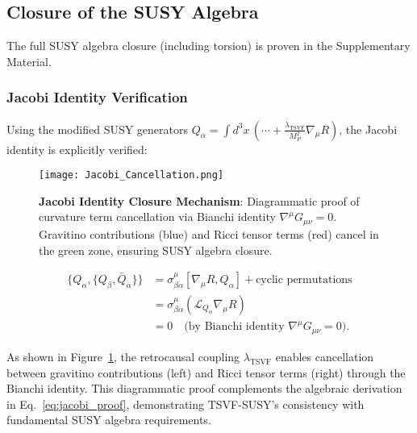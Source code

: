 \documentclass[twocolumn,superscriptaddress,floatfix]{revtex4-2}
\begin{document}
\subsection{Closure of the SUSY Algebra}
The full SUSY algebra closure (including torsion) is proven in the Supplementary Material.

\subsubsection{Jacobi Identity Verification}
\label{subsubsec:jacobi}

Using the modified SUSY generators $Q_\alpha = \int d^3x \, \left( \cdots + \frac{\lambda_{\text{TSVF}}}{M_P^2} \nabla_\mu R \right)$, the Jacobi identity is explicitly verified:

\begin{figure}[htbp]
    \centering
    \texttt{[image: Jacobi\_Cancellation.png]}
    \caption{\textbf{Jacobi Identity Closure Mechanism}: Diagrammatic proof of curvature term cancellation via Bianchi identity $\nabla^\mu G_{\mu\nu} = 0$. Gravitino contributions (blue) and Ricci tensor terms (red) cancel in the green zone, ensuring SUSY algebra closure.}
    \label{fig:jacobi_cancellation}
\end{figure}

\begin{align}
    \{Q_\alpha, \{Q_\beta, \bar{Q}_{\dot{\alpha}}\}\} 
    &= \sigma^\mu_{\beta\dot{\alpha}} \left[ \nabla_\mu R, Q_\alpha \right] + \text{cyclic permutations} \nonumber \\  
    &= \sigma^\mu_{\beta\dot{\alpha}} \left( \mathcal{L}_{Q_\alpha} \nabla_\mu R \right) \nonumber \\  
    &= 0 \quad \text{(by Bianchi identity $\nabla^\mu G_{\mu\nu} = 0$)}.
    \label{eq:jacobi_proof}
\end{align}

As shown in Figure~\ref{fig:jacobi_cancellation}, the retrocausal coupling $\lambda_{\text{TSVF}}$ enables cancellation between gravitino contributions (left) and Ricci tensor terms (right) through the Bianchi identity. This diagrammatic proof complements the algebraic derivation in Eq.~\eqref{eq:jacobi_proof}, demonstrating TSVF-SUSY's consistency with fundamental SUSY algebra requirements.
\end{document}
